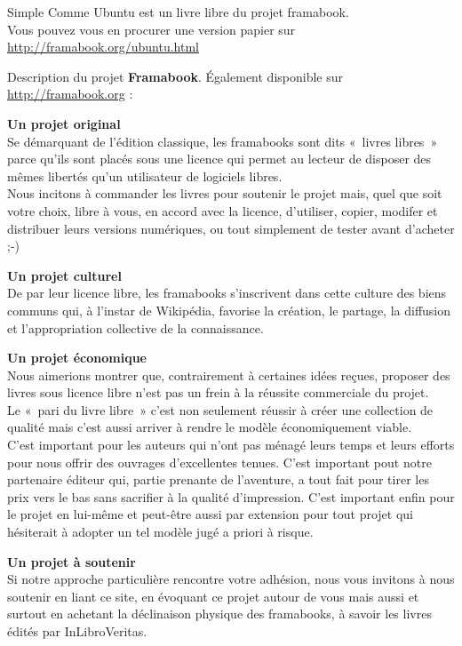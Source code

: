 \thispagestyle{empty}
\null{}
{\centering\fontsize{14}{16}\selectfont{}Simple Comme Ubuntu est un livre libre du projet framabook.\\
Vous pouvez vous en procurer une version papier sur\\\url{http://framabook.org/ubuntu.html}}\par
{\fontsize{12}{14}\selectfont{}Description du projet \textbf{Framabook}. Également disponible sur \url{http://framabook.org} :\par
\textbf{Un projet original}\\
Se démarquant de l'édition classique, les framabooks sont dits «~livres libres~» parce qu'ils sont placés sous une licence qui permet au lecteur de disposer des mêmes libertés qu'un utilisateur de logiciels libres.\\
Nous incitons à commander les livres pour soutenir le projet mais, quel que soit votre choix, libre à vous, en accord avec la licence, d'utiliser, copier, modifer et distribuer leurs versions numériques, ou tout simplement de tester avant d'acheter ;-)\par
\textbf{Un projet culturel}\\
De par leur licence libre, les framabooks s'inscrivent dans cette culture des biens communs qui, à l'instar de Wikipédia, favorise la création, le partage, la diffusion et l'appropriation collective de la connaissance.\par
\textbf{Un projet économique}\\
Nous aimerions montrer que, contrairement à certaines idées reçues, proposer des livres sous licence libre n'est pas un frein à la réussite commerciale du projet.\\
Le «~pari du livre libre~» c'est non seulement réussir à créer une collection de qualité mais c'est aussi arriver à rendre le modèle économiquement viable.\\
C'est important pour les auteurs qui n'ont pas ménagé leurs temps et leurs efforts pour nous offrir des ouvrages d'excellentes tenues. C'est important pout notre partenaire éditeur qui, partie prenante de l'aventure, a tout fait pour tirer les prix vers le bas sans sacrifier à la qualité d'impression. C'est important enfin pour le projet en lui-même et peut-être aussi par extension pour tout projet qui hésiterait à adopter un tel modèle jugé a priori à risque.\par
\textbf{Un projet à soutenir}\\
Si notre approche particulière rencontre votre adhésion, nous vous invitons à nous soutenir en liant ce site, en évoquant ce projet autour de vous mais aussi et surtout en achetant la déclinaison physique des framabooks, à savoir les livres édités par InLibroVeritas.\\
}

